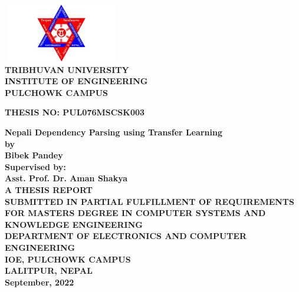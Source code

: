 \begin{titlingpage} %
\begin{normalsize}
\begin{center}
\includegraphics[width=2in, height=1in]{logo}\\ %

\bfseries 
TRIBHUVAN UNIVERSITY\\
 INSTITUTE OF ENGINEERING\\

\textbf{PULCHOWK CAMPUS}\\
\end{center}
\vspace{1cm}
\bfseries THESIS NO: PUL076MSCSK003\\
\begin{center}
\textbf{Nepali Dependency Parsing using Transfer Learning} \\
\vspace{2cm}
\bfseries by\\
    \textbf{Bibek Pandey}\\
\vspace{1cm}
\bfseries Supervised by:\\
    \textbf{Asst. Prof. Dr. Aman Shakya}\\
\vspace{1cm}
{\textbf{A THESIS REPORT\\SUBMITTED IN PARTIAL FULFILLMENT OF REQUIREMENTS FOR
    MASTERS DEGREE IN COMPUTER SYSTEMS AND KNOWLEDGE
    ENGINEERING}}\\
\vspace{2cm}
\bfseries {DEPARTMENT OF ELECTRONICS AND COMPUTER ENGINEERING}\\
IOE, PULCHOWK CAMPUS \\
LALITPUR, NEPAL\\
\vspace{1.5cm}
September, 2022
\end{center}
\end{normalsize}
\end{titlingpage}
\newpage
